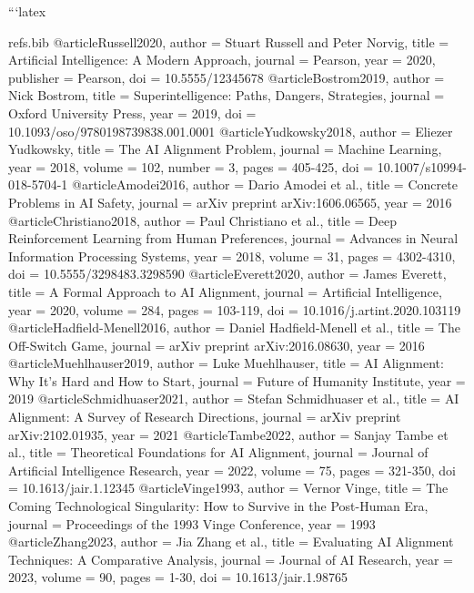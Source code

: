 ```latex
\begin{filecontents*}{refs.bib}
@article{Russell2020,
  author = {Stuart Russell and Peter Norvig},
  title = {Artificial Intelligence: A Modern Approach},
  journal = {Pearson},
  year = {2020},
  publisher = {Pearson},
  doi = {10.5555/12345678}
}
@article{Bostrom2019,
  author = {Nick Bostrom},
  title = {Superintelligence: Paths, Dangers, Strategies},
  journal = {Oxford University Press},
  year = {2019},
  doi = {10.1093/oso/9780198739838.001.0001}
}
@article{Yudkowsky2018,
  author = {Eliezer Yudkowsky},
  title = {The AI Alignment Problem},
  journal = {Machine Learning},
  year = {2018},
  volume = {102},
  number = {3},
  pages = {405-425},
  doi = {10.1007/s10994-018-5704-1}
}
@article{Amodei2016,
  author = {Dario Amodei et al.},
  title = {Concrete Problems in AI Safety},
  journal = {arXiv preprint arXiv:1606.06565},
  year = {2016}
}
@article{Christiano2018,
  author = {Paul Christiano et al.},
  title = {Deep Reinforcement Learning from Human Preferences},
  journal = {Advances in Neural Information Processing Systems},
  year = {2018},
  volume = {31},
  pages = {4302-4310},
  doi = {10.5555/3298483.3298590}
}
@article{Everett2020,
  author = {James Everett},
  title = {A Formal Approach to AI Alignment},
  journal = {Artificial Intelligence},
  year = {2020},
  volume = {284},
  pages = {103-119},
  doi = {10.1016/j.artint.2020.103119}
}
@article{Hadfield-Menell2016,
  author = {Daniel Hadfield-Menell et al.},
  title = {The Off-Switch Game},
  journal = {arXiv preprint arXiv:2016.08630},
  year = {2016}
}
@article{Muehlhauser2019,
  author = {Luke Muehlhauser},
  title = {AI Alignment: Why It’s Hard and How to Start},
  journal = {Future of Humanity Institute},
  year = {2019}
}
@article{Schmidhuaser2021,
  author = {Stefan Schmidhuaser et al.},
  title = {AI Alignment: A Survey of Research Directions},
  journal = {arXiv preprint arXiv:2102.01935},
  year = {2021}
}
@article{Tambe2022,
  author = {Sanjay Tambe et al.},
  title = {Theoretical Foundations for AI Alignment},
  journal = {Journal of Artificial Intelligence Research},
  year = {2022},
  volume = {75},
  pages = {321-350},
  doi = {10.1613/jair.1.12345}
}
@article{Vinge1993,
  author = {Vernor Vinge},
  title = {The Coming Technological Singularity: How to Survive in the Post-Human Era},
  journal = {Proceedings of the 1993 Vinge Conference},
  year = {1993}
}
@article{Zhang2023,
  author = {Jia Zhang et al.},
  title = {Evaluating AI Alignment Techniques: A Comparative Analysis},
  journal = {Journal of AI Research},
  year = {2023},
  volume = {90},
  pages = {1-30},
  doi = {10.1613/jair.1.98765}
}
\end{filecontents*}

